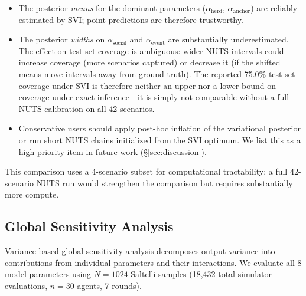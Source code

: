 \documentclass[12pt]{article}
\begin{document}
\begin{itemize}
    \item The posterior \emph{means} for the dominant parameters ($\alpha_{\text{herd}}$, $\alpha_{\text{anchor}}$) are reliably estimated by SVI; point predictions are therefore trustworthy.
    \item The posterior \emph{widths} on $\alpha_{\text{social}}$ and $\alpha_{\text{event}}$ are substantially underestimated. The effect on test-set coverage is ambiguous: wider NUTS intervals could increase coverage (more scenarios captured) or decrease it (if the shifted means move intervals away from ground truth). The reported 75.0\% test-set coverage under SVI is therefore neither an upper nor a lower bound on coverage under exact inference---it is simply not comparable without a full NUTS calibration on all 42 scenarios.
    \item Conservative users should apply post-hoc inflation of the variational posterior or run short NUTS chains initialized from the SVI optimum. We list this as a high-priority item in future work (\S\ref{sec:discussion}).
\end{itemize}

This comparison uses a 4-scenario subset for computational tractability; a full 42-scenario NUTS run would strengthen the comparison but requires substantially more compute.

\subsection{Global Sensitivity Analysis}
\label{sec:sobol}

Variance-based global sensitivity analysis \citep{sobol2001} decomposes output variance into contributions from individual parameters and their interactions. We evaluate all 8 model parameters using $N = 1024$ Saltelli samples (18,432 total simulator evaluations, $n = 30$ agents, 7 rounds).
\end{document}
